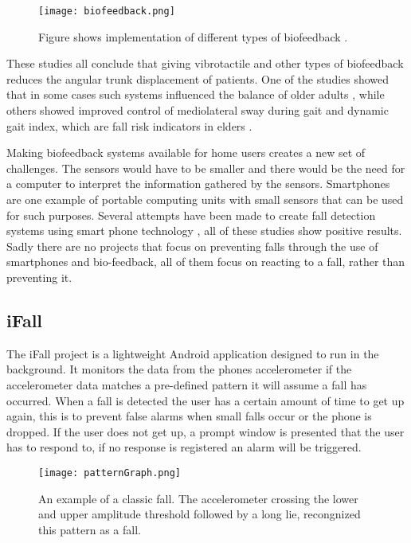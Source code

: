 \begin{figure}[h!]
  \centering
    \texttt{[image: biofeedback.png]}
    \caption{\footnotesize Figure shows implementation of different types of biofeedback \cite{multiModualBiofeedback}.}
\end{figure}

These studies all conclude that giving vibrotactile and other types of biofeedback reduces the angular trunk displacement of patients. One of the studies showed that in some cases such systems influenced the balance of older adults \cite{multiModualBiofeedback}, while others showed improved control of mediolateral sway during gait and dynamic gait index, which are fall risk indicators in elders \cite{vibrotactileTiltFeedback}.


Making biofeedback systems available for home users creates a new set of challenges. The sensors would have to be smaller and there would be the need for a computer to interpret the information gathered by the sensors. Smartphones are one example of portable computing units with small sensors that can be used for such purposes. Several attempts have been made to create fall detection systems using smart phone technology \cite{iFall, semiSupervisedFallDetection, mobilePhoneBasedFallDetection, detectionOfFalls}, all of these studies show positive results. Sadly there are no projects that focus on preventing falls through the use of smartphones and bio-feedback, all of them focus on reacting to a fall, rather than preventing it.

\subsection{iFall}
The iFall \cite{iFall} project is a lightweight Android application designed to run in the background. It monitors the data from the phones accelerometer if the accelerometer data matches a pre-defined pattern it will assume a fall has occurred. When a fall is detected the user has a certain amount of time to get up again, this is to prevent false alarms when small falls occur or the phone is dropped. If the user does not get up, a prompt window is presented that the user has to respond to, if no response is registered an alarm will be triggered. 

\begin{figure}[h!]
  \centering
    \texttt{[image: patternGraph.png]}
    \caption{\footnotesize An example of a classic fall. The accelerometer crossing the lower and upper amplitude  threshold followed by a long lie, recongnized this pattern as a fall.}
\end{figure}

